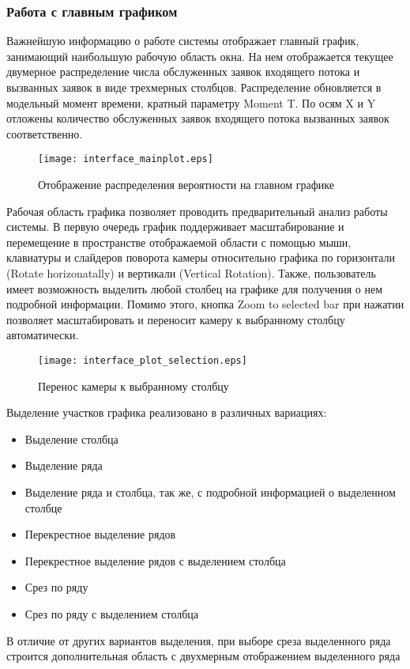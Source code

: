 \subsubsection{Работа с главным графиком}
Важнейшую информацию о работе системы отображает главный график, занимающий наибольшую рабочую область окна. На нем отображается текущее двумерное распределение числа обслуженных заявок входящего потока и вызванных заявок в виде трехмерных столбцов. Распределение обновляется в модельный момент времени, кратный параметру Moment T. По осям X и Y отложены количество обслуженных заявок входящего потока вызванных заявок соответственно.
\begin{figure}[H]
	\centering
	\texttt{[image: interface\_mainplot.eps]}
	\caption{Отображение распределения вероятности на главном графике}
	\label{interface_mainplot}
\end{figure}
Рабочая область графика позволяет проводить предварительный анализ работы системы. В первую очередь график поддерживает масштабирование и перемещение в пространстве отображаемой области с помощью мыши, клавиатуры и слайдеров поворота камеры относительно графика по горизонтали (Rotate horizonatally) и вертикали (Vertical Rotation).  Также, пользователь имеет возможность выделить любой столбец на графике для получения о нем подробной информации. Помимо этого, кнопка Zoom to selected bar при нажатии позволяет масштабировать и переносит камеру к выбранному столбцу автоматически.
\begin{figure}[H]
	\centering
	\texttt{[image: interface\_plot\_selection.eps]}
	\caption{Перенос камеры к выбранному столбцу}
	\label{interface_plot_selection}
\end{figure}
Выделение участков графика реализовано в различных вариациях:
\begin{itemize}
	\item Выделение столбца
	\item Выделение ряда
	\item Выделение ряда и столбца, так же, с подробной информацией о выделенном столбце
	\item Перекрестное выделение рядов
	\item Перекрестное выделение рядов с выделением столбца
	\item Срез по ряду
	\item Срез по ряду с выделением столбца
\end{itemize}
В отличие от других вариантов выделения, при выборе среза выделенного ряда строится дополнительная область с двухмерным отображением выделенного ряда

